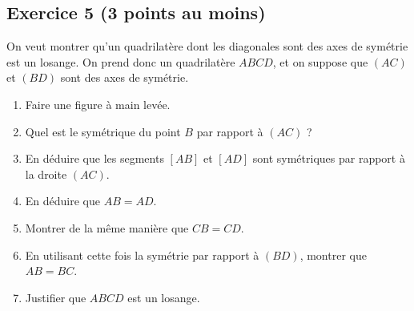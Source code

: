 \documentclass[14 pt]{extarticle}
\theoremstyle{plain}
\begin{document}
 \subsection*{Exercice 5 (3 points au moins)}
 
On veut montrer qu'un quadrilatère dont les diagonales sont des axes de symétrie est un losange. On prend donc un quadrilatère $ABCD$, et on suppose que $(AC)$ et $(BD)$ sont des axes de symétrie. 

\begin{enumerate}
\item Faire une figure à main levée.
\item Quel est le symétrique du point $B$ par rapport à $(AC)$ ?  
\item En déduire que les segments $[AB]$ et $[AD]$ sont symétriques 
par rapport à la droite $(AC)$. 
\item En déduire que $AB=AD$. 
\item Montrer de la même manière que $CB = CD$. 
\item En utilisant cette fois la symétrie par rapport à $(BD)$, 
montrer que $AB=BC$. 
\item Justifier que $ABCD$ est un losange. 
\end{enumerate}







 	
\end{document}
